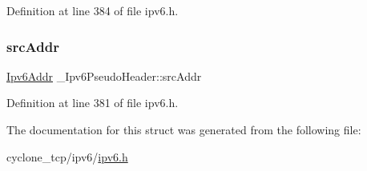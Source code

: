 Definition at line 384 of file ipv6.\+h.

\mbox{\label{struct__Ipv6PseudoHeader_a29f1e9c3b2e08e25956034292ff76059}} 
\subsubsection{\texorpdfstring{src\+Addr}{srcAddr}}
{\footnotesize\ttfamily \hyperlink{ipv6_8h_aed0cbc40c61ed5b4fb681ebc55237e89}{Ipv6\+Addr} \+\_\+\+Ipv6\+Pseudo\+Header\+::src\+Addr}



Definition at line 381 of file ipv6.\+h.



The documentation for this struct was generated from the following file\+:\begin{DoxyCompactItemize}
\item 
cyclone\+\_\+tcp/ipv6/\hyperlink{ipv6_8h}{ipv6.\+h}\end{DoxyCompactItemize}
